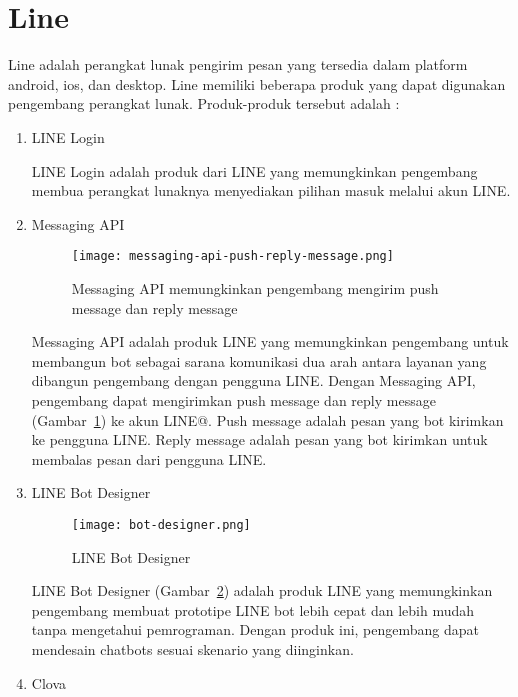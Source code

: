 \section{Line \cite{LINE-developer}}
\label{sec:Line}
Line adalah perangkat lunak pengirim pesan yang tersedia dalam platform android, ios, dan desktop. Line memiliki beberapa produk yang dapat digunakan pengembang perangkat lunak. Produk-produk tersebut adalah :
\begin{enumerate}
\item LINE Login

LINE Login adalah produk dari LINE yang memungkinkan pengembang membua perangkat lunaknya menyediakan pilihan masuk melalui akun LINE.

\item Messaging API

\begin{figure}[H]
	\centering  
	\texttt{[image: messaging-api-push-reply-message.png]}  
	\caption[Push message dan reply message pada Messaging API]{Messaging API memungkinkan pengembang mengirim push message dan reply message} 
	\label{fig:messaging-api-push-reply-message} 
\end{figure}

Messaging API adalah produk LINE yang memungkinkan pengembang untuk membangun bot sebagai sarana komunikasi dua arah antara layanan yang dibangun pengembang dengan pengguna LINE. Dengan Messaging API, pengembang dapat mengirimkan push message dan reply message (Gambar~\ref{fig:messaging-api-push-reply-message}) ke akun LINE@. Push message adalah pesan yang bot kirimkan ke pengguna LINE. Reply message adalah pesan yang bot kirimkan untuk membalas pesan dari pengguna LINE.

\item LINE Bot Designer

\begin{figure}[H]
	\centering  
	\texttt{[image: bot-designer.png]}  
	\caption[LINE Bot Designer]{LINE Bot Designer} 
	\label{fig:bot-designer} 
\end{figure}

LINE Bot Designer (Gambar~\ref{fig:bot-designer}) adalah produk LINE yang memungkinkan pengembang membuat prototipe LINE bot lebih cepat dan lebih mudah tanpa mengetahui pemrograman. Dengan produk ini, pengembang dapat mendesain chatbots sesuai skenario yang diinginkan.

\item Clova


\end{enumerate}
